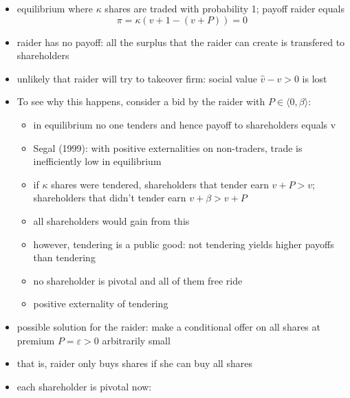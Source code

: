\documentclass[11pt,english]{beamer}
\newcommand{\ve}{\varepsilon}
\begin{document}
\begin{frame}[allowframebreaks]
\begin{itemize}
\item equilibrium where $\kappa$ shares are traded with probability 1; payoff raider equals
\label{sec-5-1-9}%
\begin{equation*}
\pi = \kappa (v+1 - (v+P)) = 0
\end{equation*}

\item raider has no payoff: all the surplus that the raider can create is transfered to shareholders\\
\label{sec-5-1-10}%
\item unlikely that raider will try to takeover firm: social value $\hat v - v>0$ is lost\\
\label{sec-5-1-11}%
\item To see why this happens, consider a bid by the raider with $P \in \langle 0,\beta \rangle$:
\label{sec-5-1-12}%
\begin{itemize}

\item in equilibrium no one tenders and hence payoff to shareholders equals v\\
\label{sec-5-1-12-1}%
\item Segal (1999): with positive externalities on non-traders, trade is inefficiently low in equilibrium\\
\label{sec-5-1-12-2}%
\item if $\kappa$ shares were tendered, shareholders that tender earn $v+P >v$; shareholders that didn't tender earn $v+\beta> v+P$\\
\label{sec-5-1-12-3}%
\item all shareholders would gain from this\\
\label{sec-5-1-12-4}%
\item however, tendering is a public good: not tendering yields higher payoffs than tendering\\
\label{sec-5-1-12-5}%
\item no shareholder is pivotal and all of them free ride\\
\label{sec-5-1-12-6}%
\item positive externality of tendering\\
\label{sec-5-1-12-7}%
\end{itemize} %

\item possible solution for the raider: make a conditional offer on all shares at premium $P=\ve>0$ arbitrarily small\\
\label{sec-5-1-13}%
\item that is, raider only buys shares if she can buy all shares\\
\label{sec-5-1-14}%
\item each shareholder is pivotal now:
\label{sec-5-1-15}%
\begin{itemize}


\end{itemize}
\end{itemize}
\end{frame}
\end{document}
